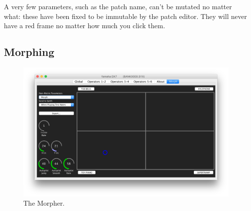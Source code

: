 \documentclass{article}
\begin{document}

A very few parameters, such as the patch name, can't be mutated no matter what: these have been fixed to be immutable by the patch editor.  They will never have a red frame no matter how much you click them.




\subsection{Morphing}
\label{morph}

\begin{figure}
\vspace{-2em}\includegraphics[scale=0.27]{Morph.png}
\vspace{-3em}
\caption{The Morpher.}
\vspace{-1em}
\label{morphpanel}
\end{figure}
\end{document}
